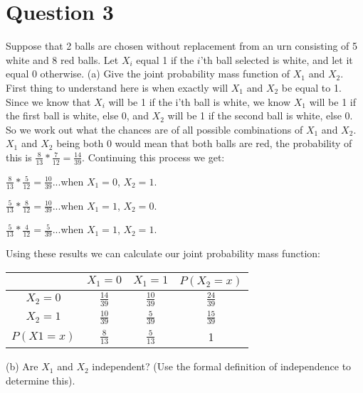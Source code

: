 \documentclass[12pt]{report}
\begin{document}
\section{Question 3}
Suppose that 2 balls are chosen without replacement from an urn consisting of 5 white and 8 red balls. Let $X_i$ equal 1 if the $i$'th ball selected is white, and let it equal 0 otherwise. 
\newline
\newline
(a) Give the joint probability mass function of $X_1$ and $X_2$.
\newline
First thing to understand here is when exactly will $X_1$ and $X_2$ be equal to 1. Since we know that $X_i$ will be 1 if the i'th ball is white, we know $X_1$ will be 1 if the first ball is white, else 0, and $X_2$ will be 1 if the second ball is white, else 0. So we work out what the chances are of all possible combinations of $X_1$ and $X_2$. $X_1$ and $X_2$ being both 0 would mean that both balls are red, the probability of this is $\frac{8}{13} * \frac{7}{12} = \frac{14}{39}$. Continuing this process we get:
\newline
\begin{center}
$\frac{8}{13} * \frac{5}{12} = \frac{10}{39}$...when $X_1 = 0$, $X_2 = 1$.
\end{center}
\begin{center}
$\frac{5}{13} * \frac{8}{12} = \frac{10}{39}$...when $X_1 = 1$, $X_2 = 0$.
\end{center}
\begin{center}
$\frac{5}{13} * \frac{4}{12} = \frac{5}{39}$...when $X_1 = 1$, $X_2 = 1$.
\end{center}
Using these results we can calculate our joint probability mass function:
\begin{center}
\begin{tabular}{ |c|c|c|c|}
\hline
& $X_1 = 0$ & $X_1 = 1$ & $P(X_2 = x)$ \\
\hline 
$X_2 = 0$ & $\frac{14}{39}$ & $\frac{10}{39}$ & $\frac{24}{39}$ \\
\hline
$X_2 = 1$ & $\frac{10}{39}$ & $\frac{5}{39}$ & $\frac{15}{39}$\\
\hline
$P(X1 = x)$ & $\frac{8}{13}$ & $\frac{5}{13}$ & 1\\
\hline
\end{tabular}
\end{center}
\quad
\newline
\newline
(b) Are $X_1$ and $X_2$ independent? (Use the formal definition of independence to determine this).
\end{document}
